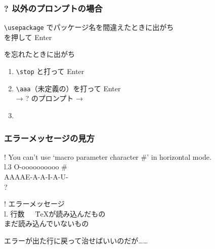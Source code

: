 \begin{frame}[fragile]
	\frametitle{{\errorfont ?} 以外のプロンプトの場合}
	\begin{block}{\errorfont{}}
		{\footnotesize \verb+\usepackage+ でパッケージ名を間違えたときに出がち}\\
		を押して Enter
	\end{block}

	\hspace*{5em}\hrulefill\hspace*{5em}

	\begin{block}{\errorfont\fbox{*}}
		{\footnotesize \verb++ を忘れたときに出がち}
		\begin{enumerate}
			\item \verb+\stop+ と打って Enter
			\item \verb+\aaa+（未定義の）を打って Enter\\
				→ {\errorfont ?} のプロンプト → 
			\item {}
		\end{enumerate}
	\end{block}
\end{frame}

\begin{frame}
	\frametitle{エラーメッセージの見方}
	
	\bgroup\errorfont
	\begin{tabbing}
		! You can't use `macro parameter character \#' in horizontal mode.\\
		l.3 O-oooooooooo \#\=\\
		                  \>AAAAE-A-A-I-A-U- \\
		?
	\end{tabbing}
	\egroup
	\pause

	\begin{tabbing}
	! エラーメッセージ\\
	l. 行数~~~\= \TeX が読み込んだもの\=\\
		\>\>まだ読み込んでいないもの
	\end{tabbing}

	エラーが出た行に戻って治せばいいのだが……
\end{frame}

